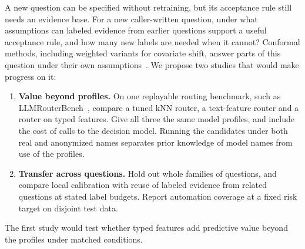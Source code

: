 A new question can be specified without retraining, but its acceptance rule still needs an evidence base. For a new caller-written question, under what assumptions can labeled evidence from earlier questions support a useful acceptance rule, and how many new labels are needed when it cannot? Conformal methods, including weighted variants for covariate shift, answer parts of this question under their own assumptions~\cite{angelopoulos2021gentle}. We propose two studies that would make progress on it:
\begin{enumerate}
\item \textbf{Value beyond profiles.} On one replayable routing benchmark, such as LLMRouterBench~\cite{li2026llmrouterbench}, compare a tuned kNN router, a text-feature router and a router on typed features. Give all three the same model profiles, and include the cost of calls to the decision model. Running the candidates under both real and anonymized names separates prior knowledge of model names from use of the profiles.
\item \textbf{Transfer across questions.} Hold out whole families of questions, and compare local calibration with reuse of labeled evidence from related questions at stated label budgets. Report automation coverage at a fixed risk target on disjoint test data.
\end{enumerate}
The first study would test whether typed features add predictive value beyond the profiles under matched conditions.

